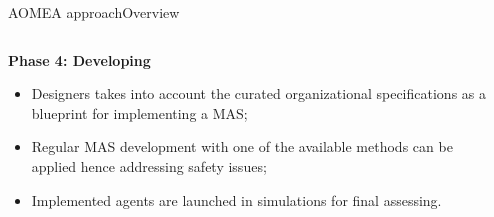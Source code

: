 \begin{frame}{AOMEA approach}{Overview}

    \begin{columns}

        \begin{column}{0.5\textwidth}

            \textbf{Phase 4: Developing}

            \begin{itemize}
                \item Designers takes into account the curated organizational specifications as a blueprint for implementing a MAS;
                \item Regular MAS development with one of the available methods can be applied hence addressing safety issues;
                \item Implemented agents are launched in simulations for final assessing.
            \end{itemize}

        \end{column}

        \begin{column}{0.5\textwidth}
            \centering
        \end{column}


\end{columns}
\end{frame}
